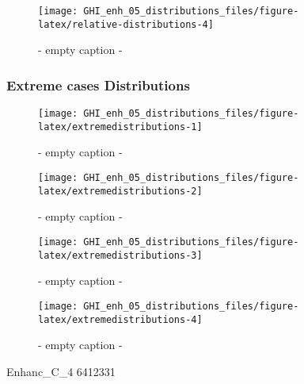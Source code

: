 \documentclass[
  10pt,
  a4paper,oneside]{article}
\begin{document}
\begin{figure}[H]

{\centering \texttt{[image: GHI\_enh\_05\_distributions\_files/figure-latex/relative-distributions-4]} 

}

\caption{ - empty caption - }\label{fig:relative-distributions-4}
\end{figure}

\FloatBarrier

\hypertarget{extreme-cases-distributions}{%
\subsubsection{Extreme cases Distributions}\label{extreme-cases-distributions}}

\begin{figure}[H]

{\centering \texttt{[image: GHI\_enh\_05\_distributions\_files/figure-latex/extremedistributions-1]} 

}

\caption{ - empty caption - }\label{fig:extremedistributions-1}
\end{figure}
\begin{figure}[H]

{\centering \texttt{[image: GHI\_enh\_05\_distributions\_files/figure-latex/extremedistributions-2]} 

}

\caption{ - empty caption - }\label{fig:extremedistributions-2}
\end{figure}
\begin{figure}[H]

{\centering \texttt{[image: GHI\_enh\_05\_distributions\_files/figure-latex/extremedistributions-3]} 

}

\caption{ - empty caption - }\label{fig:extremedistributions-3}
\end{figure}
\begin{figure}[H]

{\centering \texttt{[image: GHI\_enh\_05\_distributions\_files/figure-latex/extremedistributions-4]} 

}

\caption{ - empty caption - }\label{fig:extremedistributions-4}
\end{figure}

Enhanc\_C\_4
6412331
\end{document}

